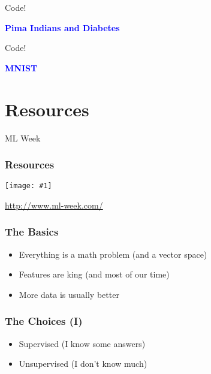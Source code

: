 \documentclass{beamer}
\newcommand\blue[1]{\textcolor{blue}{#1}}
\newcommand\cimggg[1]{\vfill\centerline{\texttt{[image: \#1]}}\vfill}
\newcommand\vphrase[1]{\vfill\centerline{\large\bf\blue{#1}}\vfill}
\begin{document}
\begin{frame}{Code!}
  \vphrase{Pima Indians and Diabetes}
\end{frame}

\begin{frame}{Code!}
  \vphrase{MNIST}
\end{frame}


  


\section{Resources}
\label{sec:resources}

\begin{frame}{ML Week}
  \frametitle{Resources}
  \cimggg{ml-week.png}

  \vspace{5mm}
  \centerline{\url{http://www.ml-week.com/}}
\end{frame}

\begin{frame}
  \frametitle{The Basics}

  \begin{itemize}
  \item Everything is a math problem (and a vector space)
  \item Features are king (and most of our time)
  \item More data is usually better
  \end{itemize}
\end{frame}

\begin{frame}
  \frametitle{The Choices (I)}
    
  \begin{itemize}
  \item Supervised (I know some answers)
  \item Unsupervised (I don't know much)
  \end{itemize}
\end{frame}
\end{document}
